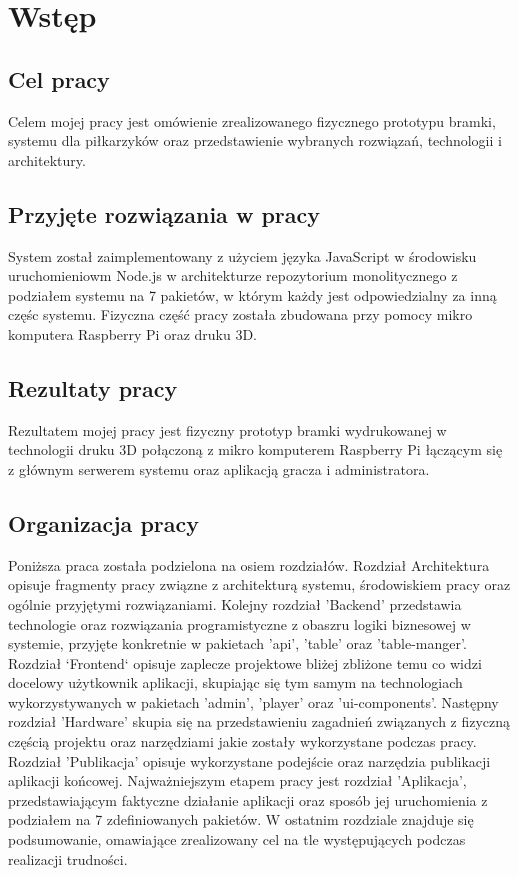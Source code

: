 \chapter{Wstęp}
\label{ch:funplenop}

\section{Cel pracy}
Celem mojej pracy jest omówienie zrealizowanego fizycznego prototypu bramki, systemu dla piłkarzyków oraz przedstawienie wybranych rozwiązań, technologii i architektury.

\section{Przyjęte rozwiązania w pracy}
System został zaimplementowany z użyciem języka JavaScript w środowisku uruchomieniowm Node.js w architekturze repozytorium monolitycznego z podziałem systemu na 7 pakietów, w którym każdy jest odpowiedzialny za inną częśc systemu. Fizyczna część pracy została zbudowana przy pomocy mikro komputera Raspberry Pi oraz druku 3D.

\section{Rezultaty pracy}
Rezultatem mojej pracy jest fizyczny prototyp bramki wydrukowanej w technologii druku 3D połączoną z mikro komputerem Raspberry Pi łączącym się z głównym serwerem systemu oraz aplikacją gracza i administratora.

\section{Organizacja pracy}
Poniższa praca została podzielona na osiem rozdziałów.
Rozdział Architektura opisuje fragmenty pracy związne z architekturą systemu, środowiskiem pracy oraz ogólnie przyjętymi rozwiązaniami. 
Kolejny rozdział 'Backend' przedstawia technologie oraz rozwiązania programistyczne z obaszru logiki biznesowej w systemie, przyjęte konkretnie w pakietach 'api', 'table' oraz 'table-manger'.
Rozdział `Frontend` opisuje zaplecze projektowe bliżej zbliżone temu co widzi docelowy użytkownik aplikacji, skupiając się tym samym na technologiach wykorzystywanych w pakietach 'admin', 'player' oraz 'ui-components'.
Następny rozdział 'Hardware' skupia się na przedstawieniu zagadnień związanych z fizyczną częścią projektu oraz narzędziami jakie zostały wykorzystane podczas pracy.
Rozdział 'Publikacja' opisuje wykorzystane podejście oraz narzędzia publikacji aplikacji końcowej.
Najważniejszym etapem pracy jest rozdział 'Aplikacja', przedstawiającym faktyczne działanie aplikacji oraz sposób jej uruchomienia z podziałem na 7 zdefiniowanych pakietów.
W ostatnim rozdziale znajduje się podsumowanie, omawiające zrealizowany cel na tle występujących podczas realizacji trudności.
